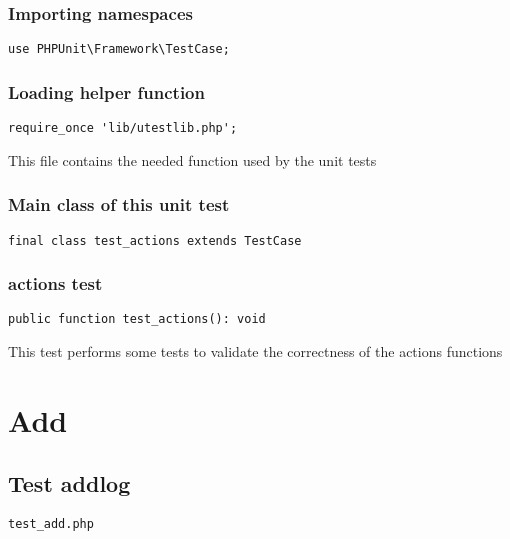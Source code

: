 \documentclass[a4paper]{article}
\begin{document}
\subsubsection{Importing namespaces}

\begin{lstlisting}
use PHPUnit\Framework\TestCase;
\end{lstlisting}

\hypertarget{toc15}{}
\subsubsection{Loading helper function}

\begin{lstlisting}
require_once 'lib/utestlib.php';
\end{lstlisting}

This file contains the needed function used by the unit tests

\hypertarget{toc16}{}
\subsubsection{Main class of this unit test}

\begin{lstlisting}
final class test_actions extends TestCase
\end{lstlisting}

\hypertarget{toc17}{}
\subsubsection{actions test}

\begin{lstlisting}
public function test_actions(): void
\end{lstlisting}

This test performs some tests to validate the correctness
of the actions functions


\hypertarget{toc18}{}
\section{Add}

\hypertarget{toc19}{}
\subsection{Test addlog}

\begin{lstlisting}
test_add.php
\end{lstlisting}
\end{document}
